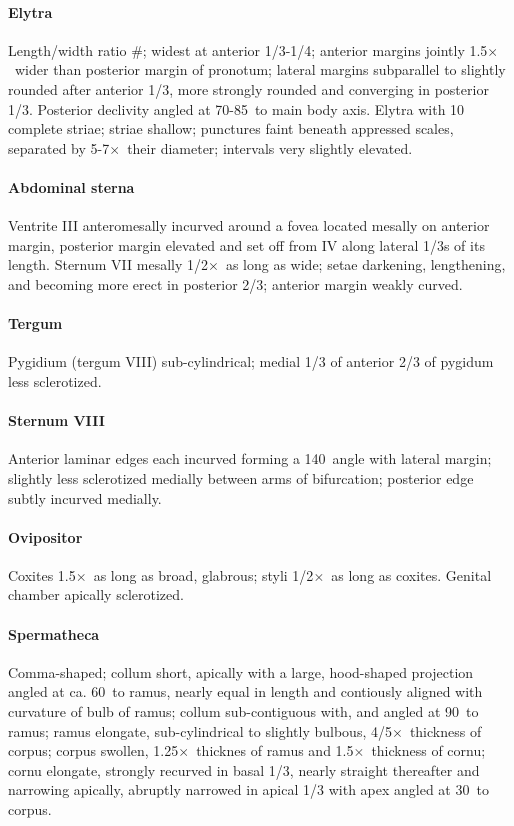 \documentclass[fleqn,10pt,lineno]{wlpeerj} %
\newcommand{\td}{\textdegree~}
\newcommand{\x}{$\times$~}
\begin{document}
			\paragraph{Elytra}
				Length/width ratio \#; widest at anterior 1/3-1/4; anterior margins jointly 1.5\x wider than posterior margin of pronotum; lateral margins subparallel to slightly rounded after anterior 1/3, more strongly rounded and converging in posterior 1/3. 
				Posterior declivity angled at 70-85\td to main body axis. Elytra with 10 complete striae; striae shallow; punctures faint beneath appressed scales, separated by 5-7\x their diameter; intervals very slightly elevated.
			\paragraph{Abdominal sterna}
				Ventrite III anteromesally incurved around a fovea located mesally on anterior margin, posterior margin elevated and set off from IV along lateral 1/3s of its length. 
				Sternum VII mesally 1/2\x as long as wide; setae darkening, lengthening, and becoming more erect in posterior 2/3; anterior margin weakly curved.
			\paragraph{Tergum}
				Pygidium (tergum VIII) sub-cylindrical; medial 1/3 of anterior 2/3 of pygidum less sclerotized.
			\paragraph{Sternum VIII}
				Anterior laminar edges each incurved forming a 140\td angle with lateral margin; slightly less sclerotized medially between arms of bifurcation; posterior edge subtly incurved medially.
			\paragraph{Ovipositor}
				Coxites 1.5\x as long as broad, glabrous; styli 1/2\x as long as coxites. Genital chamber apically sclerotized.
			\paragraph{Spermatheca}
				Comma-shaped; collum short, apically with a large, hood-shaped projection angled at ca. 60\td to ramus, nearly equal in length and contiously aligned with curvature of bulb of ramus; collum sub-contiguous with, and angled at 90\td to ramus; ramus elongate, sub-cylindrical to slightly bulbous, 4/5\x thickness of corpus; corpus swollen, 1.25\x thicknes of ramus and 1.5\x thickness of cornu; cornu elongate, strongly recurved in basal 1/3, nearly straight thereafter and narrowing apically, abruptly narrowed in apical 1/3 with apex angled at 30\td to corpus.
\end{document}
